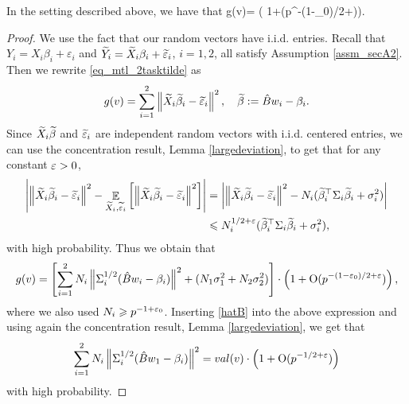 \begin{claim}
	In the setting described above, we have that
	\be\label{approxvalid}
		g(v)=  \cdot \left( 1+\OO(p^{-(1-\e_0)/2+\e})\right).
	\ee
\end{claim}
\begin{proof}
	We use the fact that our random vectors have i.i.d. entries.
	Recall that $Y_i = X_i\beta_i + \varepsilon_i$ and $\widetilde Y_i = \widetilde X_i\beta_i + \widetilde\varepsilon_i$, $i=1,2$, all satisfy Assumption \ref{assm_secA2}. Then we rewrite \eqref{eq_mtl_2tasktilde} as
$$	g( v) = \sum_{i=1}^2\left\| \widetilde X_i\widetilde\beta_i  - \widetilde {{\varepsilon}}_i\right\|^2 , \quad \widetilde\beta:=\hat B w_i-\beta_i.$$
Since $ \widetilde X_i\widetilde\beta$ and $ \widetilde {{\varepsilon}}_i$ are independent random vectors with i.i.d. centered entries, we can use the concentration result, Lemma \ref{largedeviation}, to get that for any constant ${\varepsilon}>0$,
\begin{align*}
\left|\left\| \widetilde X_i\widetilde\beta_i  - \widetilde {{\varepsilon}}_i\right\|^2 -  \mathop{\mathbb{E}}_{\widetilde X_i,\widetilde{{\varepsilon}}_i}\left[ \left\| \widetilde X_i\widetilde\beta_i  - \widetilde {{\varepsilon}}_i\right\|^2 \right] \right| & =\left|\left\| \widetilde X_i\widetilde\beta_i  - \widetilde {{\varepsilon}}_i\right\|^2 - N_i (\widetilde\beta_i^\top \Sigma_i \widetilde\beta_i + \sigma_i^2) \right| \\
&\leqslant N_i^{1/2+{\varepsilon}} (\widetilde\beta_i^\top \Sigma_i \widetilde\beta_i + \sigma_i^2),
\end{align*}
with high probability. Thus we obtain that
$$g(v)= \left[\sum_{i=1}^2 N_i\left\|\Sigma_i^{1/2}( \hat B w_i - \beta_i) \right\|^2 + (N_1\sigma^2_1+N_2\sigma^2_2)\right]\cdot \left( 1+\operatorname{O}(p^{-(1-{\varepsilon}_0)/2+{\varepsilon}})\right),$$
where we also used $N_i\geqslant p^{-1+{\varepsilon}_0}$. Inserting \eqref{hatB} into the above expression and using
 again the concentration result, Lemma \ref{largedeviation}, we get that
$$ \sum_{i=1}^2 N_i\left\|\Sigma_i^{1/2}( \hat B w_1 - \beta_i) \right\|^2 = val(v)\cdot \left( 1+\operatorname{O}(p^{-1/2+{\varepsilon}})\right)$$
with high probability.

\end{proof}
